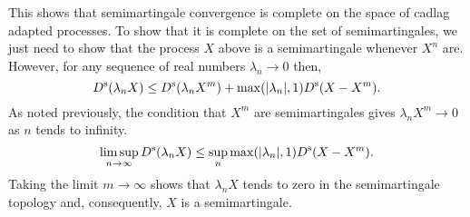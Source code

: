 \documentclass[12pt]{article}
\begin{document}
This shows that semimartingale convergence is complete on the space of cadlag adapted processes. To show that it is complete on the set of semimartingales, we just need to show that the process $X$ above is a semimartingale whenever $X^n$ are.
However, for any sequence of real numbers $\lambda_n\rightarrow 0$ then,
\begin{equation*}
D^{\rm s}(\lambda_n X)\le D^{\rm s}(\lambda_nX^m)+\max(|\lambda_n|,1)D^{\rm s}(X-X^m).
\end{equation*}
As noted previously, the condition that $X^m$ are semimartingales gives $\lambda_nX^m\rightarrow 0$ as $n$ tends to infinity.
\begin{equation*}
\limsup_{n\rightarrow\infty}D^{\rm s}(\lambda_n X)\le \sup_n\max(|\lambda_n|,1)D^{\rm s}(X-X^m).
\end{equation*}
Taking the limit $m\rightarrow\infty$ shows that $\lambda_n X$ tends to zero in the semimartingale topology and, consequently, $X$ is a semimartingale.

\end{document}
